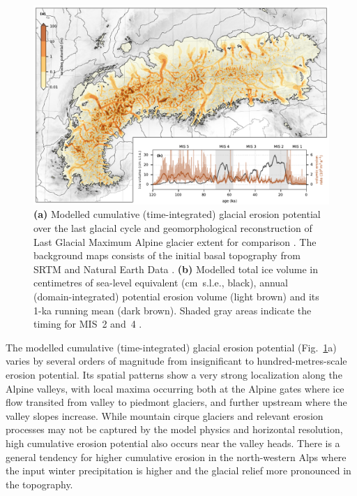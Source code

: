 \documentclass[esurf, manuscript]{copernicus}
\begin{document}
    \begin{figure}
      \centerline{\includegraphics{alpero_cumulative}}
      \caption{%
        \textbf{(a)} Modelled cumulative (time-integrated) glacial erosion
          potential over the last glacial cycle and geomorphological
          reconstruction of Last Glacial Maximum Alpine glacier extent for
          comparison \citep[solid red line,][]{Ehlers.etal.2011}.
          The background maps consists of the initial basal topography from
          SRTM \citep{Jarvis.etal.2008} and Natural Earth Data
          \citep{Patterson.Kelso.2017}.
        \textbf{(b)} Modelled total ice volume in centimetres of sea-level
          equivalent (cm~s.l.e., black), annual (domain-integrated) potential
          erosion volume (light brown) and its 1-ka running mean (dark brown).
          Shaded gray areas indicate the timing for MIS~2 and~4
          \citep{Lisiecki.Raymo.2005}.}
        \label{fig:cumulative}
    \end{figure}

    The modelled cumulative (time-integrated) glacial erosion potential
    (Fig.~\ref{fig:cumulative}a) varies by several orders of magnitude
    from insignificant to hundred-metres-scale erosion potential. Its spatial
    patterns show a very strong localization along the Alpine valleys, with
    local maxima occurring both at
    the Alpine gates where ice flow transited from valley to piedmont glaciers,
    and further upstream where the valley slopes increase. While mountain
    cirque glaciers and relevant erosion processes may not be captured by the
    model physics and horizontal resolution, high
    cumulative erosion potential also occurs near the valley heads.
    There is a general tendency for higher cumulative erosion in the
    north-western Alps where the input winter precipitation is higher
    \citep[WorldClim, Fig.~1h in][]{Seguinot.etal.2018} and the glacial relief
    more pronounced in the topography.
\end{document}
